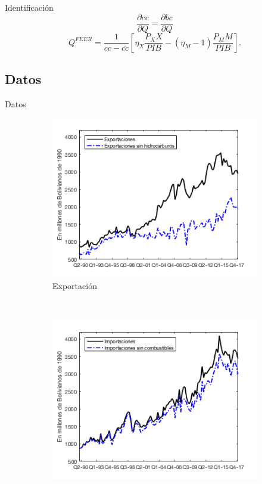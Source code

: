 \documentclass{beamer}
\begin{document}
\begin{frame}{Identificación}
\begin{equation}
\frac{\partial cc}{\partial Q}=\frac{\partial bc}{\partial Q}
\end{equation}
\begin{equation}
Q^{FEER}=\frac{1}{cc-\bar{cc}}\left[\eta_X \frac{P_X X}{PIB}-(\eta_M -1)\frac{P_M M}{PIB}\right].
\end{equation}
\end{frame}

\subsection[Datos]{Datos}
\begin{frame}{Datos}
\begin{figure}
\captionsetup[subfigure]{font=scriptsize,labelfont=scriptsize}
\centering
    \begin{subfigure}[b]{0.31\textwidth}
        \includegraphics[width=\textwidth]{10exp}
        \caption{Exportación}
    \end{subfigure}
    ~ %
    \begin{subfigure}[b]{0.31\textwidth}
        \includegraphics[width=\textwidth]{11imp}

\end{subfigure}
\end{figure}
\end{frame}
\end{document}

